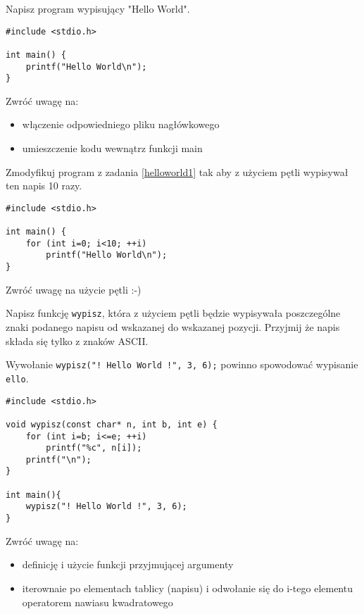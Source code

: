 \dbEntryCheckResults
Napisz program wypisujący "Hello World".
\fi

\dbEntryCheckResults
\begin{verbatim}
#include <stdio.h>

int main() {
	printf("Hello World\n");
}
\end{verbatim}

\noindent Zwróć uwagę na:
\begin{itemize}
\item włączenie odpowiedniego pliku nagłówkowego
\item umieszczenie kodu wewnątrz funkcji main
\end{itemize}
\fi


\dbEntryCheckResults
Zmodyfikuj program z zadania \ref{helloworld1} tak aby z użyciem pętli wypisywał ten napis 10 razy.
\fi

\dbEntryCheckResults
\begin{verbatim}
#include <stdio.h>

int main() {
	for (int i=0; i<10; ++i)
		printf("Hello World\n");
}
\end{verbatim}

\noindent Zwróć uwagę na użycie pętli :-)
\fi


\dbEntryCheckResults
Napisz funkcję \Verb#wypisz#, która z użyciem pętli będzie wypisywała poszczególne znaki podanego napisu od wskazanej do wskazanej pozycji. Przyjmij że napis składa się tylko z znaków ASCII.

Wywołanie \Verb#wypisz("! Hello World !", 3, 6);# powinno spowodować wypisanie \Verb#ello#.
\fi

\dbEntryCheckResults
\begin{verbatim}
#include <stdio.h>

void wypisz(const char* n, int b, int e) {
	for (int i=b; i<=e; ++i)
		printf("%c", n[i]);
	printf("\n");
}

int main(){
	wypisz("! Hello World !", 3, 6);
}
\end{verbatim}

\noindent Zwróć uwagę na:
\begin{itemize}
\item definicję i użycie funkcji przyjmującej argumenty
\item iterownaie po elementach tablicy (napisu) i odwołanie się do i-tego elementu operatorem nawiasu kwadratowego
\end{itemize}
\fi


